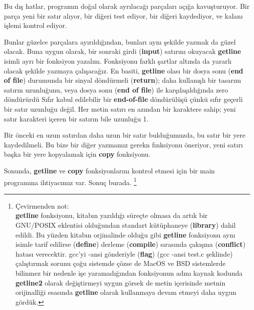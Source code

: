 \documentclass[a4paper,12pt,oneside]{book}
\begin{document}
\noindent Bu dış hatlar, programın doğal olarak ayrılacağı parçaları açığa kavuşturuyor. Bir parça yeni bir satır alıyor, bir diğeri test ediyor, bir diğeri kaydediyor, ve kalanı işlemi kontrol ediyor.
\par Bunlar güzelce parçalara ayırıldığından, bunları aynı şekilde yazmak da güzel olacak. Buna uygun olarak, bir sonraki girdi (\textbf{input}) satırını okuyacak \textbf{getline} isimli ayrı bir fonksiyon yazalım. Fonksiyonu farklı şartlar altında da yararlı olacak şekilde yazmaya çalışacağız. En basiti, \textbf{getline} olası bir dosya sonu (\textbf{end of file}) durumunda bir sinyal döndürmeli (\textbf{return}); daha kullanışlı bir tasarım satırın uzunluğunu, veya dosya sonu (\textbf{end of file}) ile karşılaşıldığında zero döndürürdü Sıfır kabul edilebilir bir \textbf{end-of-file} döndürülüşü çünkü sıfır geçerli bir satır uzunluğu değil. Her metin satırı en azından bir karaktere sahip; yeni satır karakteri içeren bir satırın bile uzunluğu 1.
\par Bir önceki en uzun satırdan daha uzun bir satır bulduğumuzda, bu satır bir yere kaydedilmeli. Bu bize bir diğer yazmamız gerekn fınksiyonu öneriyor, yeni satırı başka bir yere kopyalamak için \textbf{copy} fonksiyonu.
\par Sonunda, \textbf{getline} ve \textbf{copy} fonksiyonlarını kontrol etmesi için bir main programına ihtiyacımız var. Sonuç burada. \footnote{\noindent Çevirmenden not: \\ \indent \textbf{getline} fonksiyonu, kitabın yazıldığı süreçte olmasa da artık bir GNU/POSIX eklentisi olduğundan standart kütüphaneye (\textbf{library}) dahil edildi. Bu yüzden kitabın orjinalinde olduğu gibi \textbf{getline} fonksiyonu aynı isimle tarif edilirse (\textbf{define}) derleme (\textbf{compile}) sırasında çakışma (\textbf{conflict}) hatası verecektir. gcc'yi -ansi gönderiyle (\textbf{flag}) (gcc -ansi test.c şeklinde) çalıştırmak sorunu çoğu sistemde çözse de MacOS ve BSD sistemlerde bilinmez bir nedenle işe yaramadığından fonksiyonun adını kaynak kodunda \textbf{getline2} olarak değiştirmeyi uygun görsek de metin içerisinde metnin orijinalliği esasında \textbf{getline} olarak kullanmaya devam etmeyi daha uygun gördük.} \pagebreak
\enlargethispage{2\baselineskip}
\end{document}
